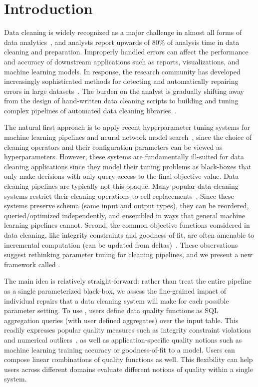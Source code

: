 \section{Introduction}\label{intro}\sloppy
Data cleaning is widely recognized as a major challenge in almost all forms of data analytics~\cite{nytimes}, and analysts report upwards of 80\% of analysis time in data cleaning and preparation.
Improperly handled errors can affect the performance and accuracy of downstream applications such as reports, visualizations, and machine learning models.
In response, the research community has developed increasingly sophisticated methods for detecting and automatically repairing errors in large datasets~\cite{dc, rekatsinas2017holoclean, DBLP:journals/pvldb/KrishnanWWFG16, DBLP:conf/sigmod/ChuIKW16, mudgal2018deep, doan2018toward}.
The burden on the analyst is gradually shifting away from the design of hand-written data cleaning scripts to building and tuning complex pipelines of automated data cleaning libraries~\cite{krishnan2016hilda}.

The natural first approach is to apply recent hyperparameter tuning systems for machine learning pipelines and neural network model search~\cite{li2017hyperband, sparks2017keystoneml, baylor2017tfx, golovin2017google, liaw2018tune}, since the choice of cleaning operators and their configuration parameters can be viewed as hyperparameters.
However, these systems are fundamentally ill-suited for data cleaning applications since they model their tuning problems as black-boxes that only make decisions with only query access to the final objective value.
Data cleaning pipelines are typically not this opaque.
Many popular data cleaning systems restrict their cleaning operations to cell replacements~\cite{rekatsinas2017holoclean,DBLP:conf/sigmod/ChuIKW16, DBLP:journals/pvldb/KrishnanWWFG16}.
Since these systems preserve schema (same input and output types), they can be reordered, queried/optimized independently, and ensembled in ways that general machine learning pipelines cannot.
Second, the common objective functions considered in data cleaning, like integrity constraints and goodness-of-fit, are often amenable to incremental computation (can be updated from deltas)~\cite{fan2014incremental}.
These observations suggest rethinking parameter tuning for cleaning pipelines, and we present a new framework called \sys.

The main idea is relatively straight-forward: rather than treat the entire pipeline as a single parameterized black-box, we assess the fine-grained impact of individual repairs that a data cleaning system will make for each possible parameter setting.
To use \sys, users define data quality functions as SQL aggregation queries (with user defined aggregates) over the input table.  This readily expresses popular quality measures such as integrity constraint violations~\cite{ilyas2015trends} and numerical outliers~\cite{bailis2017macrobase}, as well as application-specific quality notions such as machine learning training accuracy or goodness-of-fit to a model.  Users can compose linear combinations of quality functions as well.  This flexibility can help users across different domains evaluate different notions of quality within a single system.

